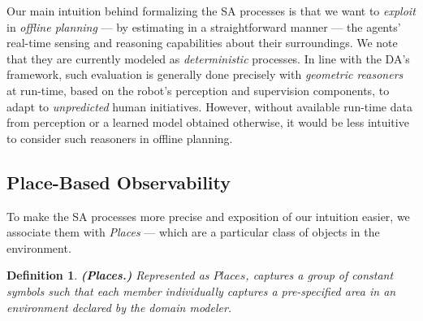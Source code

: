 \documentclass[letterpaper]{article} %
\newtheorem{definition}{Definition}
\begin{document}
Our main intuition behind formalizing the SA processes is that we want to \textit{exploit} in \textit{offline planning} --- by estimating in a straightforward manner --- the agents' real-time sensing and reasoning capabilities about their surroundings. 
We note that they are currently modeled as \textit{deterministic} processes. 
In line with the DA's framework, such evaluation is generally done precisely with \textit{geometric reasoners} at run-time, based on the robot's perception and supervision components, to adapt to \textit{unpredicted} human initiatives. 
However, without available run-time data from perception or a learned model obtained otherwise, it would be less intuitive to consider such reasoners in offline planning.

\subsection{Place-Based Observability}




To make the SA processes more precise and exposition of our intuition easier, we associate them with  \textit{Places} --- which are a particular class of objects in the environment. 

\begin{definition} \label{def:places}
\textbf{(Places.)} Represented as $\mathit{Places}$, captures a group of constant symbols such that each member individually captures a pre-specified area in an environment declared by the domain modeler.  
\end{definition}
\end{document}
